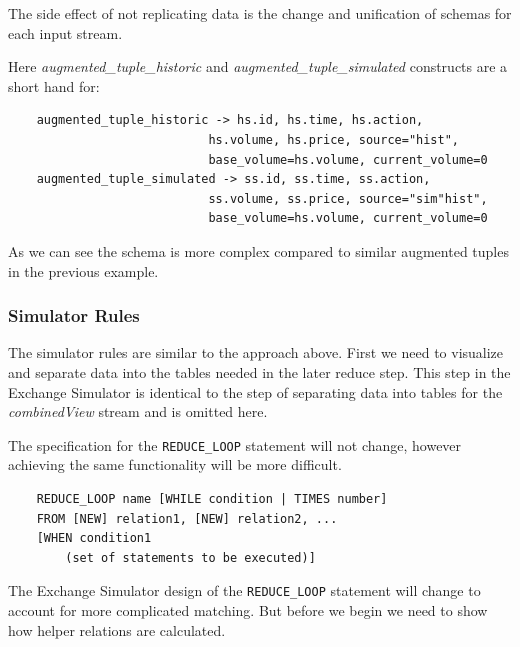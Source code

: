 \documentclass{article}
\begin{document}
The side effect of not replicating data is the change and unification of schemas for each input stream. 

Here \emph{augmented\_tuple\_historic} and \emph{augmented\_tuple\_simulated} constructs are a short hand for:

\begin{verbatim}
    augmented_tuple_historic -> hs.id, hs.time, hs.action,
                            hs.volume, hs.price, source="hist",
                            base_volume=hs.volume, current_volume=0
    augmented_tuple_simulated -> ss.id, ss.time, ss.action,
                            ss.volume, ss.price, source="sim"hist",
                            base_volume=hs.volume, current_volume=0
\end{verbatim}

As we can see the schema is more complex compared to similar augmented tuples in the previous example.

\subsubsection{Simulator Rules}

The simulator rules are similar to the approach above. First we need to visualize and separate data into the tables needed in the later reduce step. This step in the Exchange Simulator is identical to the step of separating data into tables for the \emph{combinedView} stream and is omitted here.

The specification for the {\tt REDUCE\_LOOP} statement will not change, however achieving the same functionality will be more difficult. 

\begin{verbatim}
    REDUCE_LOOP name [WHILE condition | TIMES number]
    FROM [NEW] relation1, [NEW] relation2, ... 
    [WHEN condition1
        (set of statements to be executed)]
\end{verbatim}

The Exchange Simulator design of the {\tt REDUCE\_LOOP} statement will change to account for more complicated matching. But before we begin we need to show how helper relations are calculated.
\end{document}
